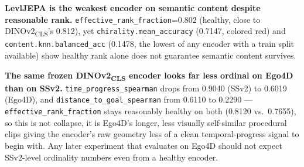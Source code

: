 \textbf{LevlJEPA is the weakest encoder on semantic content despite reasonable rank.}
\texttt{effective\_rank\_fraction}=0.802 (healthy, close to DINOv2\textsubscript{CLS}'s
0.812), yet \texttt{chirality.mean\_accuracy} (0.7147, colored red) and
\texttt{content.knn.balanced\_acc} (0.1478, the lowest of any encoder with a train split
available) show healthy rank alone does not guarantee semantic content survives.

\textbf{The same frozen DINOv2\textsubscript{CLS} encoder looks far less ordinal on
Ego4D than on SSv2.} \texttt{time\_progress\_spearman} drops from 0.9040 (SSv2) to
0.6019 (Ego4D), and \texttt{distance\_to\_goal\_spearman} from 0.6110 to 0.2290 ---
\texttt{effective\_rank\_fraction} stays reasonably healthy on both (0.8120 vs.\ 0.7655),
so this is not collapse, it is Ego4D's longer, less visually self-similar procedural
clips giving the encoder's raw geometry less of a clean temporal-progress signal to
begin with. Any later experiment that evaluates on Ego4D should not expect SSv2-level
ordinality numbers even from a healthy encoder.
